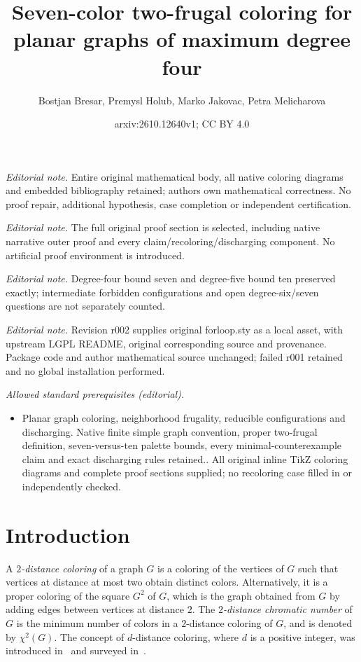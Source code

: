 \documentclass[10pt,a4paper]{article}
\title{Seven-color two-frugal coloring for planar graphs of maximum degree four}
\author{Bostjan Bresar, Premysl Holub, Marko Jakovac, Petra Melicharova}
\date{arxiv:2610.12640v1; CC BY 4.0}
\begin{document}
\maketitle
\noindent\textit{Editorial note.} Entire original mathematical body, all native coloring diagrams and embedded bibliography retained; authors own mathematical correctness. No proof repair, additional hypothesis, case completion or independent certification.\par\medskip
\noindent\textit{Editorial note.} The full original proof section is selected, including native narrative outer proof and every claim/recoloring/discharging component. No artificial proof environment is introduced.\par\medskip
\noindent\textit{Editorial note.} Degree-four bound seven and degree-five bound ten preserved exactly; intermediate forbidden configurations and open degree-six/seven questions are not separately counted.\par\medskip
\noindent\textit{Editorial note.} Revision r002 supplies original forloop.sty as a local asset, with upstream LGPL README, original corresponding source and provenance. Package code and author mathematical source unchanged; failed r001 retained and no global installation performed.\par\medskip
\noindent\textit{Allowed standard prerequisites (editorial).}\begin{itemize}
\item Planar graph coloring, neighborhood frugality, reducible configurations and discharging. Native finite simple graph convention, proper two-frugal definition, seven-versus-ten palette bounds, every minimal-counterexample claim and exact discharging rules retained.. All original inline TikZ coloring diagrams and complete proof sections supplied; no recoloring case filled in or independently checked.
\end{itemize}\medskip
\section{Introduction}
\label{sec:intro}

A {\em $2$-distance coloring} of a graph $G$ is a coloring of the vertices of $G$ such that vertices at distance at most two obtain distinct colors. Alternatively, it is a proper coloring of the square $G^2$ of $G$, which is the graph obtained from $G$ by adding edges between vertices at distance $2$. The {\em $2$-distance chromatic number} of $G$ is the minimum number of colors in a $2$-distance coloring of $G$, and is denoted by $\chi^2(G)$.   The concept of $d$-distance coloring, where $d$ is a positive integer, was introduced in~\cite{Kramer_intro} and surveyed in~\cite{Kramer_surv}.  
\end{document}

